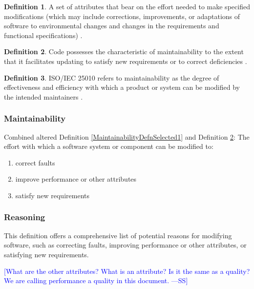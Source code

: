 \documentclass[letterpaper, cleveref]{lipics-v2019}
\newcommand{\authornote}[3]{\textcolor{#1}{[#3 ---#2]}}
\newcommand{\authornote}[3]{}
\newcommand{\wss}[1]{\authornote{blue}{SS}{#1}} %
\theoremstyle{definition}
\newtheorem{defn}{Definition}
\begin{document}
\begin{defn}
  A set of attributes that bear on the effort needed to make specified
  modifications (which may include corrections, improvements, or adaptations of
  software to environmental changes and changes in the requirements and
  functional specifications) \citep{pfleeger2006software}.
\end{defn}

\begin{defn} \label{MaintainabilityDefnSelected2}
  Code possesses the characteristic of maintainability to the extent that it
  facilitates updating to satisfy new requirements or to correct deficiencies
  \citep{boehm2007software}.
\end{defn}

\begin{defn}
  ISO/IEC 25010 refers to maintainability as the degree of effectiveness and
  efficiency with which a product or system can be modified by the intended
  maintainers \citep{ISO/IEC25010}. %
\end{defn}

\begin{mybox}
\subsubsection*{Maintainability}
Combined altered Definition \ref{MaintainabilityDefnSelected1} and Definition
\ref{MaintainabilityDefnSelected2}: The effort with which a software system or
component can be modified to:
\begin{enumerate}
	\item correct faults
	\item improve performance or other
	attributes
	\item satisfy new requirements
\end{enumerate}
\end{mybox}

\subsubsection*{Reasoning}

This definition offers a comprehensive list of potential reasons for modifying
software, such as correcting faults, improving performance or other attributes,
or satisfying new requirements.

\wss{What are the other attributes?  What is an attribute?  Is it the same
as a quality?  We are calling performance a quality in this document.}
\end{document}
